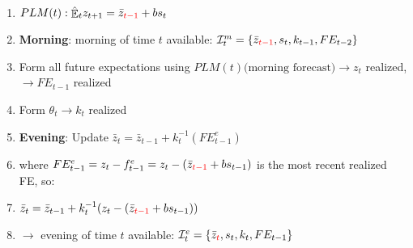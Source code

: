 \documentclass[11pt]{article}
\renewcommand{\[}{\begin{equation}}
\renewcommand{\]}{\end{equation}}
\DeclareMathOperator{\E}{\mathbb{E}}
\begin{document}
\begin{enumerate}
\item[] $PLM(t): \hat{\E}_t z_{t+1} = \bar{z}_{\color{red}{t-1}} + bs_t$
\item[] \textbf{Morning}: morning of time $t$ available: $\mathcal{I}_t^m = \{\bar{z}_{\color{red}{t-1}}, s_t, k_{t-1}, FE_{t-2}\}$
\item Form all future expectations using $PLM(t) \text{(morning forecast)} \rightarrow z_t$ realized, $\rightarrow FE_{t-1}$ realized 
\item Form $\theta_t \rightarrow k_t$ realized
\item \textbf{Evening}: Update $\bar{z}_t = \bar{z}_{t-1} + k_t^{-1}(FE^e_{t-1})$
\item[] where $FE^e_{t-1} = z_{t}-f^e_{t-1} = z_{t}-(\bar{z}_{\color{red}{t-1}} + bs_{t-1})$ is the most recent realized FE, so:
\item[] $\bar{z}_t = \bar{z}_{t-1} + k_t^{-1}(z_{t}-(\bar{z}_{\color{red}{t-1}} + bs_{t-1}))$
\item[] $\rightarrow$ evening of time $t$ available: $\mathcal{I}_t^e = \{\bar{z}_{\color{red}{t}}, s_t, k_{t}, FE_{t-1}\}$
\end{enumerate}

\clearpage
\end{document}
